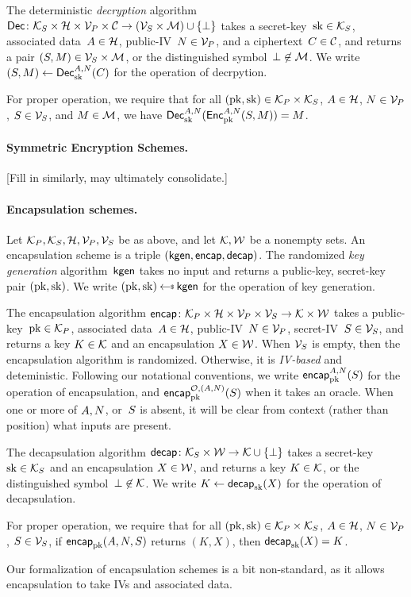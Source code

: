 The deterministic \emph{decryption} algorithm $\Dec \colon \seckeys \times \adata \times \pubivs \times \ctxts \to \left(\secivs \times \ptxts\right) \cup \{\bot\}$ takes a secret-key~$\sk\in\seckeys$, associated data~$\header \in \adata$, public-IV~$\pubiv \in \pubivs$, and a ciphertext~$C \in \ctxts$, and returns a pair $(S,M) \in \secivs\times\ptxts$, or the distinguished symbol~$\bot \not\in \ptxts$.  We write $(S,M) \gets \Decprim{\sk}{\header,\pubiv}{C}$ for the operation of decrpytion. 

For proper operation, we require that for all $(\pk,\sk)\in\pubkeys\times\seckeys$, $\header\in\adata$, $\pubiv\in\pubivs$, $\seciv\in\secivs$, and $M\in\ptxts$, we have $\Decprim{\sk}{\header,\pubiv}{\Encprim{\pk}{\header,\pubiv}{S,M}}=M$.

\paragraph{Symmetric Encryption Schemes. } [Fill in similarly, may ultimately consolidate.]

\paragraph{Encapsulation schemes. }
Let $\pubkeys, \seckeys, \adata, \pubivs, \secivs$ be as above, and let $\keys,\wraps$ be a nonempty sets.
%
An encapsulation scheme is a triple $(\pkgen,\encap,\decap)$.   The randomized \emph{key generation} algorithm~$\pkgen$ takes no input and returns a public-key, secret-key pair $(\pk,\sk)$.  We write $(\pk,\sk)\getsr\pkgen$ for the operation of key generation. 

The encapsulation algorithm $\encap \colon \pubkeys \times \adata \times \pubivs \times \secivs \to \keys \times \wraps$ takes a public-key~$\pk\in\pubkeys$, associated data~$\header \in \adata$, public-IV~$\pubiv \in \pubivs$, secret-IV~$\seciv \in \secivs$, and returns a key $K \in \keys$ and an encapsulation $X \in \wraps$. 
When $\secivs$ is empty, then the encapsulation algorithm is randomized.  Otherwise, it is \emph{IV-based} and deteministic.  Following our notational conventions, we write $\encapprim{\pk}{\header,\pubiv}{S}$ for the operation of encapsulation, and $\encapprimO{\pk}{\header,\pubiv}{\seciv}{\mathcal{O}}$ when it takes an oracle.  When one or more of $\header,\pubiv$, or~$\seciv$ is absent, it will be clear from context (rather than position) what inputs are present.

The decapsulation algorithm $\decap \colon \seckeys \times \wraps \to \keys \cup \{\bot\}$ takes a secret-key~$\sk\in\seckeys$ and an encapsulation $X \in \wraps$, and returns a key $K \in \keys$, or the distinguished symbol~$\bot \not\in \keys$.  We write $K \gets \decap_{\sk}(X)$ for the operation of decapsulation. 

For proper operation, we require that for all $(\pk,\sk)\in\pubkeys\times\seckeys$, $\header\in\adata$, $\pubiv\in\pubivs$, $\seciv\in\secivs$, if $\encap_{\pk}(\header,\pubiv,\seciv)$ returns $(K,X)$, then $\decap_{\sk}(X)=K$.

Our formalization of encapsulation schemes is a bit non-standard, as it allows encapsulation to take IVs and associated data.
